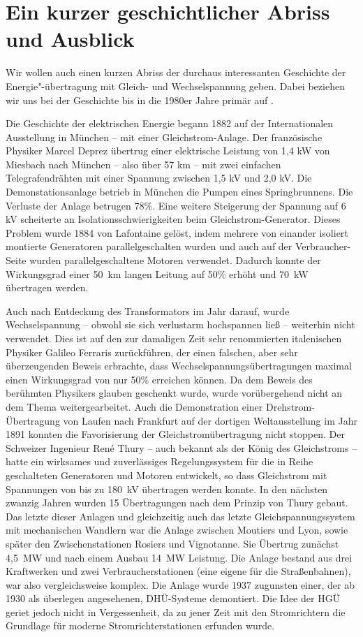 
\section{Ein kurzer geschichtlicher Abriss und Ausblick}
Wir wollen auch einen kurzen Abriss der durchaus interessanten Geschichte der Energie"-übertragung mit Gleich- und Wechselspannung geben. Dabei beziehen wir uns bei der Geschichte bis in die 1980er Jahre primär auf \cite{Schymroch}.

Die Geschichte der elektrischen Energie begann 1882 auf der Internationalen Ausstellung in München – mit einer Gleichstrom-Anlage. Der französische Physiker Marcel Deprez übertrug einer elektrische Leistung von 1,4 kW von Miesbach nach München – also über 57 km – mit zwei einfachen Telegrafendrähten mit einer Spannung zwischen 1,5 kV und 2,0 kV. Die Demonstationsanlage betrieb in München die Pumpen eines Springbrunnens. Die Verluste der Anlage betrugen 78\%. Eine weitere Steigerung der Spannung auf 6 kV scheiterte an Isolationsschwierigkeiten beim Gleichstrom-Generator. Dieses Problem wurde 1884 von Lafontaine gelöst, indem mehrere von einander isoliert montierte Generatoren parallelgeschalten wurden und auch auf der Verbraucher-Seite wurden parallelgeschaltene Motoren verwendet. Dadurch konnte der Wirkungsgrad einer 50\ km langen Leitung auf 50\% erhöht und 70\ kW übertragen werden.

Auch nach Entdeckung des Transformators im Jahr darauf, wurde Wechselspannung -- obwohl sie sich verlustarm hochspannen ließ -- weiterhin nicht verwendet.
Dies ist auf den zur damaligen Zeit sehr renommierten italenischen Physiker Galileo Ferraris zurückführen,
der einen falschen, aber sehr überzeugenden Beweis erbrachte, dass Wechselspannungsübertragungen maximal einen Wirkungsgrad von nur 50\% erreichen können.
Da dem Beweis des berühmten Physikers glauben geschenkt wurde, wurde vorübergehend nicht an dem Thema weitergearbeitet.
Auch die Demonstration einer Drehstrom-Übertragung von Laufen nach Frankfurt auf der dortigen Weltausstellung im Jahr 1891 konnten die Favorisierung der Gleichstromübertragung nicht stoppen.
Der Schweizer Ingenieur René Thury -- auch bekannt als der König des Gleichstroms -- hatte ein wirksames und zuverlässiges Regelungssystem für die in Reihe geschalteten Generatoren und Motoren entwickelt, so dass Gleichstrom mit Spannungen von bis zu 180\ kV übertragen werden konnte. In den nächsten zwanzig Jahren wurden 15 Übertragungen nach dem Prinzip von Thury gebaut. Das letzte dieser Anlagen und gleichzeitig auch das letzte Gleichspannungssystem mit mechanischen Wandlern war die Anlage zwischen Moutiers und Lyon, sowie später den Zwischenstationen Rosiers und Vignotanne. Sie Übertrug zunächst 4,5\ MW und nach einem Ausbau 14\ MW Leistung. Die Anlage bestand aus drei Kraftwerken und zwei Verbraucherstationen (eine eigene für die Straßenbahnen), war also vergleichsweise komplex. Die Anlage wurde 1937 zugunsten einer, der ab 1930 als überlegen angesehenen, DHÜ-Systeme demontiert. Die Idee der HGÜ geriet jedoch nicht in Vergessenheit, da zu jener Zeit mit den Stromrichtern die Grundlage für moderne Stromrichterstationen erfunden wurde.

